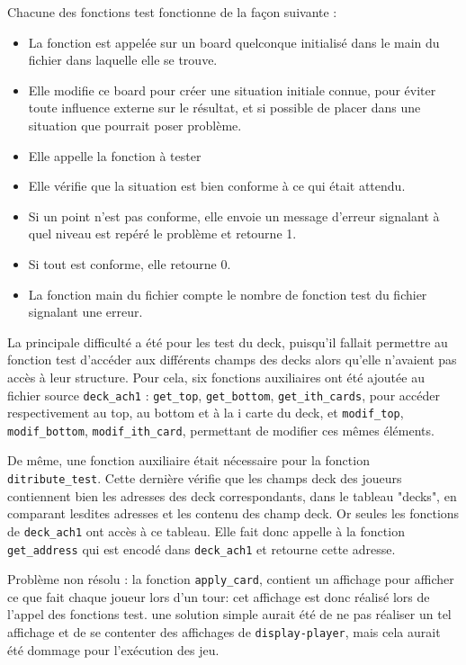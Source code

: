 Chacune des fonctions test fonctionne de la façon suivante :
\begin{itemize}
    \item La fonction est appelée sur un board quelconque initialisé dans le main du fichier dans laquelle elle se trouve.
    \item Elle modifie ce board pour créer une situation initiale connue, pour éviter toute influence externe sur le résultat, et si possible de placer dans une situation que pourrait poser problème.
    \item Elle appelle la fonction à tester
    \item Elle vérifie que la situation est bien conforme à ce qui était attendu.
    \item Si un point n'est pas conforme, elle envoie un message d'erreur signalant à quel niveau est repéré le problème et retourne 1.
    \item Si tout est conforme, elle retourne 0.
    \item La fonction main du fichier compte le nombre de fonction test du fichier signalant une erreur.
\end{itemize}


La principale difficulté a été pour les test du deck, puisqu'il fallait permettre au fonction test d'accéder aux différents champs des decks alors qu'elle n'avaient pas accès à leur structure. Pour cela, six fonctions auxiliaires ont été ajoutée au fichier source \texttt{deck\_ach1} : \texttt{get\_top}, \texttt{get\_bottom}, \texttt{get\_ith\_cards}, pour accéder respectivement au top, au bottom et à la i carte du deck, et  \texttt{modif\_top}, \texttt{modif\_bottom}, \texttt{modif\_ith\_card}, permettant de modifier ces mêmes éléments.

De même, une fonction auxiliaire était nécessaire pour la fonction \texttt{ditribute\_test}. Cette dernière vérifie que les champs deck des joueurs contiennent bien les adresses des deck correspondants, dans le tableau "decks", en comparant lesdites adresses et les contenu des champ deck. Or seules les fonctions de \texttt{deck\_ach1} ont accès à ce tableau. Elle fait donc appelle à la fonction \texttt{get\_address} qui est encodé dans \texttt{deck\_ach1} et retourne cette adresse.

Problème non résolu : la fonction \texttt{apply\_card}, contient un affichage pour afficher ce que fait chaque joueur lors d'un tour: cet affichage est donc réalisé lors de l'appel des fonctions test. une solution simple aurait été de ne pas réaliser un tel affichage et de se contenter des affichages de \texttt{display-player}, mais cela aurait été dommage pour l'exécution des jeu.


